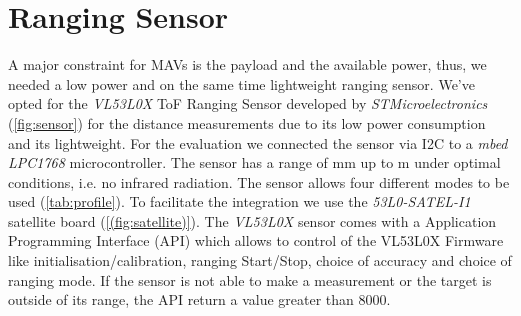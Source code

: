 \section{Ranging Sensor}
\label{sec:ranging sensor}
A major constraint for MAVs is the payload and the available power, thus, we needed a low power and on the same time lightweight ranging sensor. We've opted for the \textit{VL53L0X} ToF Ranging Sensor developed by \textit{STMicroelectronics} (\cref{fig:sensor}) for the distance measurements due to its low power consumption and its lightweight.   For the evaluation we connected the sensor via I2C to a \textit{mbed LPC1768} microcontroller. The sensor has a range of \unit[0]{mm} up to \unit[2]{m} under optimal conditions, i.e. no infrared radiation.  The sensor allows four different modes to be used (\cref{tab:profile}). To facilitate the integration we use the \textit{53L0-SATEL-I1} satellite board (\cref{(fig:satellite)}). The \textit{VL53L0X} sensor comes with a Application Programming Interface (API) which allows to control of the VL53L0X Firmware like initialisation/calibration, ranging Start/Stop, choice of accuracy and choice of ranging mode. If the sensor is not able to make a measurement or the target is outside of its range, the API return a value greater than 8000.\\
